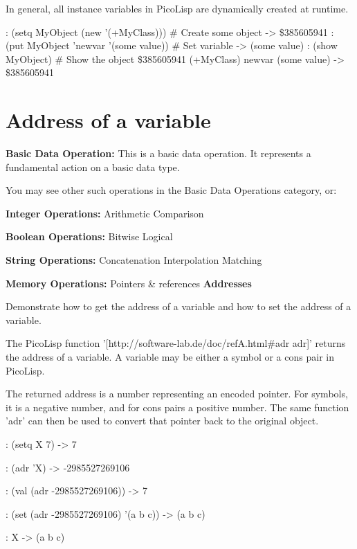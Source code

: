 \begin{wideverbatim}

In general, all instance variables in PicoLisp are dynamically created at
runtime.

: (setq MyObject (new '(+MyClass)))       # Create some object
-> \$385605941
: (put MyObject 'newvar '(some value))    # Set variable
-> (some value)
: (show MyObject)                         # Show the object
\$385605941 (+MyClass)
   newvar (some value)
-> \$385605941

\end{wideverbatim}

\pagebreak{}
\section*{Address of a variable}

\textbf{Basic Data Operation:} This is a basic data operation. It
represents a fundamental action on a basic data type.

You may see other such operations in the Basic Data Operations
category, or:

\textbf{Integer Operations:} Arithmetic \textbar{} Comparison

\textbf{Boolean Operations:} Bitwise \textbar{} Logical

\textbf{String Operations:} Concatenation \textbar{} Interpolation
\textbar{} Matching

\textbf{Memory Operations:} Pointers \& references \textbar{} \textbf{Addresses}

Demonstrate how to get the address of a variable and how to set the
address of a variable.


\begin{wideverbatim}

The PicoLisp function '[http://software-lab.de/doc/refA.html#adr adr]' returns
the address of a variable. A variable may be either a symbol or a cons pair in
PicoLisp.

The returned address is a number representing an encoded pointer. For symbols,
it is a negative number, and for cons pairs a positive number. The same function
'adr' can then be used to convert that pointer back to the original object.

: (setq X 7)
-> 7

: (adr 'X)
-> -2985527269106

: (val (adr -2985527269106))
-> 7

: (set (adr -2985527269106) '(a b c))
-> (a b c)

: X
-> (a b c)

\end{wideverbatim}

